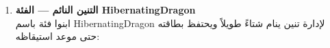 \documentclass[14pt]{extarticle}
\begin{document}
\begin{enumerate}[label=\textbf{تمرين \arabic*:}, wide=0pt, leftmargin=*, itemsep=2.2em]
    \vspace{2em}
    \noindent \textbf{الفحص في \textenglish{Main}:}
    \begin{itemize}
        \item عبّئوا تنيناً بـ $1000$ وأجروا 7 رحلات متتالية بمقادير مختلفة ($10, 20, \dots, 70$)، واطبعوا \textenglish{GetLog()} بعد كل رحلة للتأكد من عمل الإزاحة.
        \item استدعوا \textenglish{LongestFlight()} و \textenglish{CountFlightsOver(35)} و \textenglish{HasFlown(40)} و \textenglish{HasFlown(10)} واطبعوا النتائج.
    \end{itemize}

    \item \textbf{التنين النائم — الفئة \textenglish{HibernatingDragon}} \\
    ابنوا فئة باسم \textenglish{HibernatingDragon} لإدارة تنين ينام شتاءً طويلاً ويحتفظ بطاقته حتى موعد استيقاظه:


\end{enumerate}
\end{document}
